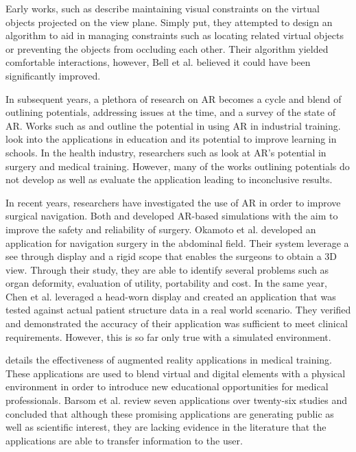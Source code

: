 Early works, such as \cite{Bell2001} describe maintaining visual constraints on the virtual objects projected on the view plane. Simply put, they attempted to design an algorithm to aid in managing constraints such as locating related virtual objects or preventing the objects from occluding each other. Their algorithm yielded comfortable interactions, however, Bell et al. believed it could have been significantly improved. 

In subsequent years, a plethora of research on AR becomes a cycle and blend of outlining potentials, addressing issues at the time, and a survey of the state of AR. Works such as \cite{Zhong2003} and \cite{Boulanger2004} outline the potential in using AR in industrial training. \cite{Bower2014} look into the applications in education and its potential to improve learning in schools. In the health industry, researchers such as \cite{Barsom2016, Chan2017, Chen2015, Okamoto2015} look at AR's potential in surgery and medical training. However, many of the works outlining potentials do not develop as well as evaluate the application leading to inconclusive results.

In recent years, researchers have investigated the use of AR in order to improve surgical navigation. Both \cite{Okamoto2015} and \cite{Chen2015} developed AR-based simulations with the aim to improve the safety and reliability of surgery. Okamoto et al. developed an application for navigation surgery in the abdominal field. Their system leverage a see through display and a rigid scope that enables the surgeons to obtain a 3D view. Through their study, they are able to identify several problems such as organ deformity, evaluation of utility, portability and cost. In the same year, Chen et al. leveraged a head-worn display and created an application that was tested against actual patient structure data in a real world scenario. They verified and demonstrated the accuracy of their application was sufficient to meet clinical requirements. However, this is so far only true with a simulated environment. 

\cite{Barsom2016} details the effectiveness of augmented reality applications in medical training. These applications are used to blend virtual and digital elements with a physical environment in order to introduce new educational opportunities for medical professionals. Barsom et al. review seven applications over twenty-six studies and concluded that although these promising applications are generating public as well as scientific interest, they are lacking evidence in the literature that the applications are able to transfer information to the user.

